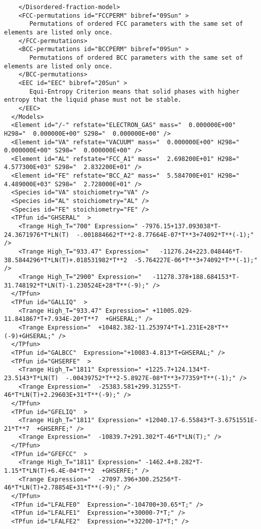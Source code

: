 \documentclass[12pt]{article}
\begin{document}
\begin{appendices}
{\begin{verbatim}
    </Disordered-fraction-model>
    <FCC-permutations id="FCCPERM" bibref="09Sun" >
       Permutations of ordered FCC parameters with the same set of elements are listed only once.
    </FCC-permutations>
    <BCC-permutations id="BCCPERM" bibref="09Sun" >
       Permutations of ordered BCC parameters with the same set of elements are listed only once.
    </BCC-permutations>
    <EEC id="EEC" bibref="20Sun" >
       Equi-Entropy Criterion means that solid phases with higher entropy that the liquid phase must not be stable.
    </EEC>
  </Models>
  <Element id="/-" refstate="ELECTRON_GAS" mass="  0.000000E+00" H298="  0.000000E+00" S298="  0.000000E+00" />
  <Element id="VA" refstate="VACUUM" mass="  0.000000E+00" H298="  0.000000E+00" S298="  0.000000E+00" />
  <Element id="AL" refstate="FCC_A1" mass="  2.698200E+01" H298="  4.577300E+03" S298="  2.832200E+01" />
  <Element id="FE" refstate="BCC_A2" mass="  5.584700E+01" H298="  4.489000E+03" S298="  2.728000E+01" />
  <Species id="VA" stoichiometry="VA" />
  <Species id="AL" stoichiometry="AL" />
  <Species id="FE" stoichiometry="FE" />
  <TPfun id="GHSERAL"  >
    <Trange High_T="700" Expression=" -7976.15+137.093038*T-24.3671976*T*LN(T)  -.001884662*T**2-8.77664E-07*T**3+74092*T**(-1);" />
    <Trange High_T="933.47" Expression="   -11276.24+223.048446*T-38.5844296*T*LN(T)+.018531982*T**2  -5.764227E-06*T**3+74092*T**(-1);" />
    <Trange High_T="2900" Expression="   -11278.378+188.684153*T-31.748192*T*LN(T)-1.230524E+28*T**(-9);" />
  </TPfun>
  <TPfun id="GALLIQ"  >
    <Trange High_T="933.47" Expression=" +11005.029-11.841867*T+7.934E-20*T**7  +GHSERAL;" />
    <Trange Expression="  +10482.382-11.253974*T+1.231E+28*T**(-9)+GHSERAL;" />
  </TPfun>
  <TPfun id="GALBCC"  Expression="+10083-4.813*T+GHSERAL;" />
  <TPfun id="GHSERFE"  >
    <Trange High_T="1811" Expression=" +1225.7+124.134*T-23.5143*T*LN(T)  -.00439752*T**2-5.8927E-08*T**3+77359*T**(-1);" />
    <Trange Expression="  -25383.581+299.31255*T-46*T*LN(T)+2.29603E+31*T**(-9);" />
  </TPfun>
  <TPfun id="GFELIQ"  >
    <Trange High_T="1811" Expression=" +12040.17-6.55843*T-3.6751551E-21*T**7  +GHSERFE;" />
    <Trange Expression="  -10839.7+291.302*T-46*T*LN(T);" />
  </TPfun>
  <TPfun id="GFEFCC"  >
    <Trange High_T="1811" Expression=" -1462.4+8.282*T-1.15*T*LN(T)+6.4E-04*T**2  +GHSERFE;" />
    <Trange Expression="  -27097.396+300.25256*T-46*T*LN(T)+2.78854E+31*T**(-9);" />
  </TPfun>
  <TPfun id="LFALFE0"  Expression="-104700+30.65*T;" />
  <TPfun id="LFALFE1"  Expression="+30000-7*T;" />
  <TPfun id="LFALFE2"  Expression="+32200-17*T;" />

\end{verbatim}}
\end{appendices}
\end{document}
